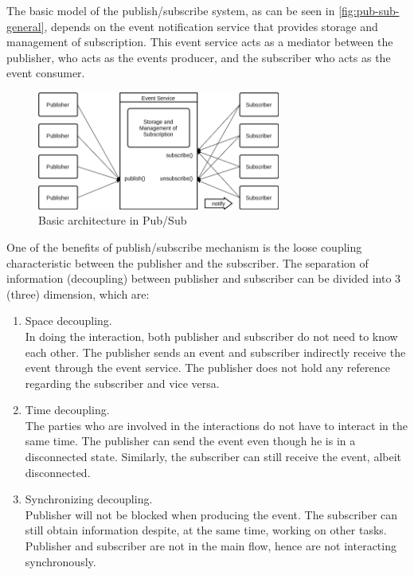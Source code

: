 \documentclass[conference]{IEEEtran}
\begin{document}
The basic model of the publish/subscribe system, as can be seen in \autoref{fig:pub-sub-general}, depends on the event notification service that provides storage and management of subscription. This event service acts as a mediator between the publisher, who acts as the events producer, and the subscriber who acts as the event consumer. 

\begin{figure}[h]
	\centering
	\includegraphics[width=8cm]{Resources/Images/pub-sub-general}
	\caption{Basic architecture in Pub/Sub \cite{eugster_many_2003}}
	\label{fig:pub-sub-general}
\end{figure}


One of the benefits of publish/subscribe mechanism is the loose coupling characteristic \cite{eugster_many_2003} between the publisher and the subscriber. The separation of information (decoupling) between publisher and subscriber can be divided into 3 (three) dimension, which are:

\begin{enumerate}
	\item Space decoupling. \\
	In doing the interaction, both publisher and subscriber do not need to know each other. The publisher sends an event and subscriber indirectly receive the event through the event service. The publisher does not hold any reference regarding the subscriber and vice versa. 
	\item Time decoupling. \\
	The parties who are involved in the interactions do not have to interact in the same time. The publisher can send the event even though he is in a disconnected state. Similarly, the subscriber can still receive the event, albeit disconnected. 
	\item Synchronizing decoupling. \\
	Publisher will not be blocked when producing the event. The subscriber can still obtain information despite, at the same time, working on other tasks. Publisher and subscriber are not in the main flow, hence are not interacting synchronously. 
\end{enumerate}
\end{document}
